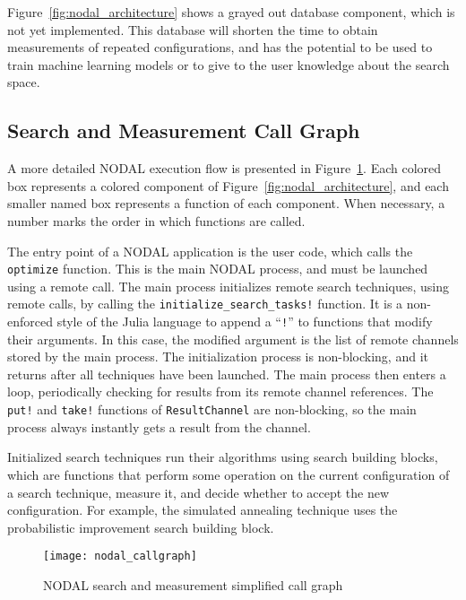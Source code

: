 Figure~\ref{fig:nodal_architecture} shows a grayed out database component,
which is not yet implemented. This database will shorten the time to obtain
measurements of repeated configurations, and has the potential to be used to
train machine learning models or to give to the user knowledge about the search
space.

\subsection{Search and Measurement Call Graph}

A more detailed NODAL execution flow is presented in
Figure~\ref{fig:nodal_callgraph}. Each colored box represents a colored
component of Figure~\ref{fig:nodal_architecture}, and each smaller named box
represents a function of each component. When necessary, a number marks the
order in which functions are called.

The entry point of a NODAL application is the user code, which calls the
\texttt{optimize} function. This is the main NODAL process, and must be
launched using a remote call. The main process initializes remote search
techniques, using remote calls, by calling the
\texttt{initialize\_search\_tasks!} function. It is a non-enforced style of the
Julia language to append a ``\texttt{!}'' to functions that modify their
arguments. In this case, the modified argument is the list of remote channels
stored by the main process.  The initialization process is non-blocking, and it
returns after all techniques have been launched. The main process then enters a
loop, periodically checking for results from its remote channel references.
The \texttt{put!} and \texttt{take!} functions of \texttt{ResultChannel} are
non-blocking, so the main process always instantly gets a result from the
channel.

Initialized search techniques run their algorithms using search building
blocks, which are functions that perform some operation on the current
configuration of a search technique, measure it, and decide whether to accept
the new configuration. For example, the simulated annealing technique uses
the probabilistic improvement search building block.

\begin{figure}[htpb]
    \centering
    \texttt{[image: nodal\_callgraph]}
    \caption{NODAL search and measurement simplified call graph}
    \label{fig:nodal_callgraph}
\end{figure}


